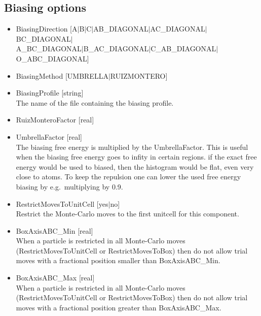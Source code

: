 \subsection*{Biasing options}
\begin{itemize}
\item{BiasingDirection [A$|$B$|$C$|$AB\_DIAGONAL$|$AC\_DIAGONAL$|$BC\_DIAGONAL$|$\\
              \hspace*{2.65cm} A\_BC\_DIAGONAL$|$B\_AC\_DIAGONAL$|$C\_AB\_DIAGONAL$|$\\
              \hspace*{2.65cm} O\_ABC\_DIAGONAL]}\\
\item{BiasingMethod [UMBRELLA$|$RUIZMONTERO]}\\
\item{BiasingProfile [string]}\\
The name of the file containing the biasing profile.
\item{RuizMonteroFactor [real]}
\item{UmbrellaFactor [real]}\\
The biasing free energy is multiplied by the UmbrellaFactor. This is useful when the biasing free energy goes to infity in certain regions. if the
exact free energy would be used to biased, then the histogram would be flat, even very close to atoms. To keep the repulsion one can lower the used free
energy biasing by e.g.\ multiplying by 0.9.
\item{RestrictMovesToUnitCell [yes$|$no]}\\
Restrict the Monte-Carlo moves to the first unitcell for this component.
\item{BoxAxisABC\_Min [real]}\\
When a particle is restricted in all Monte-Carlo moves (RestrictMovesToUnitCell or RestrictMovesToBox) then do not allow trial moves with a fractional position smaller than BoxAxisABC\_Min.
\item{BoxAxisABC\_Max [real]}\\
When a particle is restricted in all Monte-Carlo moves (RestrictMovesToUnitCell or RestrictMovesToBox) then do not allow trial moves with a fractional position greater than BoxAxisABC\_Max.
\end{itemize}

